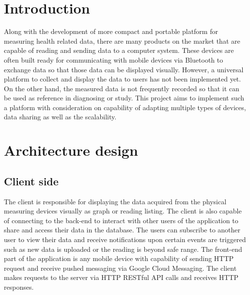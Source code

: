 
\section{Introduction} Along with the development of more compact and portable platform for measuring health related
data, there are many products on the market that are capable of reading and sending data to a computer system. These
devices are often built ready for communicating with mobile devices via Bluetooth to exchange data so that those data
can be displayed visually.  However, a universal platform to collect and display the data to users has not been
implemented yet. On the other hand, the measured data is not frequently recorded so that it can be used as reference in
diagnosing or study.  This project aims to implement such a platform with consideration on capability of adapting
multiple types of devices, data sharing as well as the scalability.  \section{Architecture design}
\label{sec:Architecture design}

\subsection{Client side}

The client is responsible for displaying the data acquired from the physical measuring devices visually as graph or
reading listing. The client is also capable of connecting to the back-end to interact with other users of the
application to share and access their data in the database. The users can subscribe to another user to view their data
and receive notifications upon certain events are triggered such as new data is uploaded or the reading is beyond safe
range.  The front-end part of the application is any mobile device with capability of sending HTTP request and receive
pushed messaging via Google Cloud Messaging. The client makes requests to the server via HTTP RESTful API calls and
receives HTTP responses.


